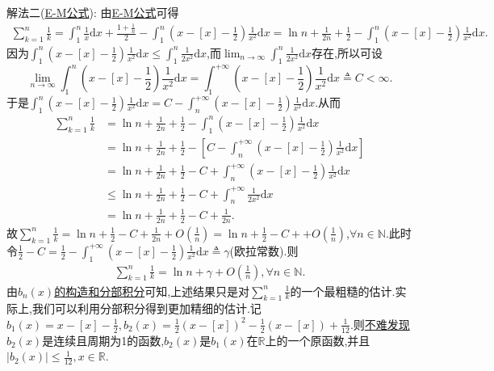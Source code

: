 \documentclass[../../main.tex]{subfiles}%
\begin{document}
\begin{solution}
{\color{blue}解法二(\hyperref[theorem:0阶Euler-Maclaurin公式(0阶E-M公式)]{E-M公式}):}
由\hyperref[theorem:0阶Euler-Maclaurin公式(0阶E-M公式)]{E-M公式}可得
\begin{align}\label{equation:4.4617}
\sum\limits_{k = 1}^n\frac{1}{k}=\int_1^n\frac{1}{x}\mathrm{d}x+\frac{1+\frac{1}{n}}{2}-\int_1^n\left(x - [x]-\frac{1}{2}\right)\frac{1}{x^2}\mathrm{d}x
=\ln n+\frac{1}{2n}+\frac{1}{2}-\int_1^n\left(x - [x]-\frac{1}{2}\right)\frac{1}{x^2}\mathrm{d}x.
\end{align}
因为\(\int_1^n\left(x - [x]-\frac{1}{2}\right)\frac{1}{x^2}\mathrm{d}x\leqslant\int_1^n\frac{1}{2x^2}\mathrm{d}x\),而\(\lim_{n\rightarrow\infty}\int_1^n\frac{1}{2x^2}\mathrm{d}x\)存在,所以可设
\[
\lim_{n\rightarrow\infty}\int_1^n\left(x - [x]-\frac{1}{2}\right)\frac{1}{x^2}\mathrm{d}x=\int_1^{+\infty}\left(x - [x]-\frac{1}{2}\right)\frac{1}{x^2}\mathrm{d}x\triangleq C<\infty.
\]
于是\(\int_1^n\left(x - [x]-\frac{1}{2}\right)\frac{1}{x^2}\mathrm{d}x = C-\int_n^{+\infty}\left(x - [x]-\frac{1}{2}\right)\frac{1}{x^2}\mathrm{d}x\).从而
\begin{align*}
\sum\limits_{k = 1}^n\frac{1}{k}&=\ln n+\frac{1}{2n}+\frac{1}{2}-\int_1^n\left(x - [x]-\frac{1}{2}\right)\frac{1}{x^2}\mathrm{d}x\\
&=\ln n+\frac{1}{2n}+\frac{1}{2}-\left[C-\int_n^{+\infty}\left(x - [x]-\frac{1}{2}\right)\frac{1}{x^2}\mathrm{d}x\right]\\
&=\ln n+\frac{1}{2n}+\frac{1}{2}-C+\int_n^{+\infty}\left(x - [x]-\frac{1}{2}\right)\frac{1}{x^2}\mathrm{d}x\\
&\leqslant\ln n+\frac{1}{2n}+\frac{1}{2}-C+\int_n^{+\infty}\frac{1}{2x^2}\mathrm{d}x\\
&=\ln n+\frac{1}{2n}+\frac{1}{2}-C+\frac{1}{2n}.
\end{align*}
故\(\sum\limits_{k=1}^n{\frac{1}{k}}=\ln n+\frac{1}{2}-C+\frac{1}{2n}+O\left( \frac{1}{n} \right) =\ln n+\frac{1}{2}-C++O\left( \frac{1}{n} \right)\),\(\forall n\in\mathbb{N}\).此时令\(\frac{1}{2}-C=\frac{1}{2}-\int_1^{+\infty}\left(x - [x]-\frac{1}{2}\right)\frac{1}{x^2}\mathrm{d}x\triangleq\gamma\)(欧拉常数).则
\begin{align}\label{equation:4.461888}
\sum\limits_{k=1}^n{\frac{1}{k}}=\ln n+\gamma+O\left( \frac{1}{n} \right),\forall n\in\mathbb{N}.
\end{align}
由\hyperlink{remark:利用0阶E-M公式精细估阶的构造}{$b_n(x)$的构造和分部积分}可知,上述结果只是对$\sum\limits_{k=1}^n{\frac{1}{k}}$的一个最粗糙的估计.实际上,我们可以利用分部积分得到更加精细的估计.记$b_1(x)=x-[x]-\frac{1}{2},b_2\left( x \right) =\frac{1}{2}\left( x-\left[ x \right] \right) ^2-\frac{1}{2}\left( x-\left[ x \right] \right) +\frac{1}{12}$.则\hyperlink{b2性质}{不难发现}$b_2(x)$是连续且周期为1的函数,$b_2(x)$是$b_1(x)$在$\mathbb{R}$上的一个原函数,并且$|b_2(x)|\leqslant  \frac{1}{12},x\in \mathbb{R}$.

\end{solution}
\end{document}
